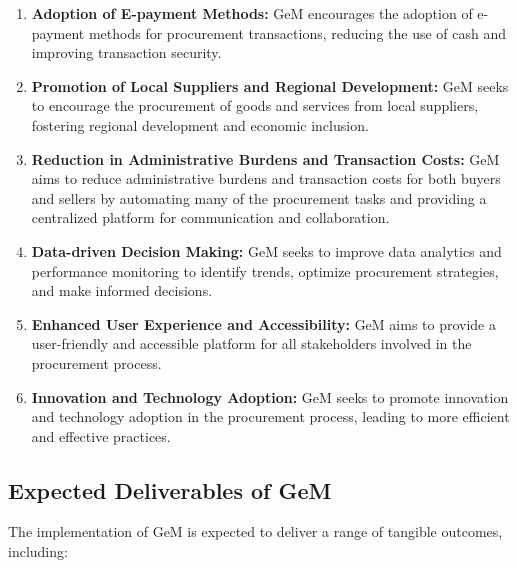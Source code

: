 \begin{enumerate}
    \item \textbf{Adoption of E-payment Methods:} GeM encourages the adoption of e-payment methods for procurement transactions, reducing the use of cash and improving transaction security.
    
    \item \textbf{Promotion of Local Suppliers and Regional Development:} GeM seeks to encourage the procurement of goods and services from local suppliers, fostering regional development and economic inclusion.
    
    \item \textbf{Reduction in Administrative Burdens and Transaction Costs:} GeM aims to reduce administrative burdens and transaction costs for both buyers and sellers by automating many of the procurement tasks and providing a centralized platform for communication and collaboration.
    
    \item \textbf{Data-driven Decision Making:} GeM seeks to improve data analytics and performance monitoring to identify trends, optimize procurement strategies, and make informed decisions.
    
    \item \textbf{Enhanced User Experience and Accessibility:} GeM aims to provide a user-friendly and accessible platform for all stakeholders involved in the procurement process.
    
    \item \textbf{Innovation and Technology Adoption:} GeM seeks to promote innovation and technology adoption in the procurement process, leading to more efficient and effective practices.
\end{enumerate}

\subsection{Expected Deliverables of GeM}

The implementation of GeM is expected to deliver a range of tangible outcomes, including:

